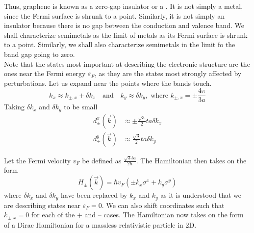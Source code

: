 \documentclass[12pt,a4paper,titlepage]{article}
\newcommand{\trm}[1]{\textrm{#1}} %
\newcommand{\ul}[1]{\underline{\smash{#1}}} %
\begin{document}
\begin{center}
\end{center}
Thus, graphene is known as a zero-gap insulator or a \ul{semimetal}. It is not simply a metal, since the Fermi surface is shrunk to a point. Similarly, it is not simply an insulator because there is no gap between the conduction and valence band. We shall characterize semimetals as the limit of metals as its Fermi surface is shrunk to a point. Similarly, we shall also characterize semimetals in the limit fo the band gap going to zero.\\

Note that the states most important at describing the electronic structure are the ones near the Fermi energy $\varepsilon_{F}$, as they are the states most strongly affected by perturbations. Let us expand near the points where the bands touch.
\begin{equation}
k_{x}\approx k_{\pm,x}+\delta k_{x}\quad\trm{and}\quad k_{y}\approx\delta k_{y},\trm{ where } k_{\pm,x}=\pm\frac{4\pi}{3a}
\end{equation}
Taking $\delta k_{x}$ and $\delta k_{y}$ to be small
\begin{equation}
\begin{aligned}
d_{\pm}^{x}(\vec{k})&\approx\pm\frac{\sqrt{3}}{2}ta\delta k_{x}\\
d_{\pm}^{y}(\vec{k})&\approx\frac{\sqrt{3}}{2}ta\delta k_{y}
\end{aligned}
\end{equation}

Let the Fermi velocity $v_{F}$ be defined as $\frac{\sqrt{3}ta}{2\hbar}$. The Hamiltonian then takes on the form
\begin{equation}
H_{\pm}(\vec{k})=\hbar v_{F}(\pm k_{x}\sigma^{x}+k_{y}\sigma^{y})
\end{equation}
where $\delta k_{x}$ and $\delta k_{y}$ have been replaced by $k_{x}$ and $k_{y}$ as it is understood that we are describing states near $\varepsilon_{F}=0$. We can also shift coordinates such that $k_{\pm,x}=0$ for each of the + and -- cases. The Hamiltonian now takes on the form of a Dirac Hamiltonian for a massless relativistic particle in 2D.\\
\end{document}
